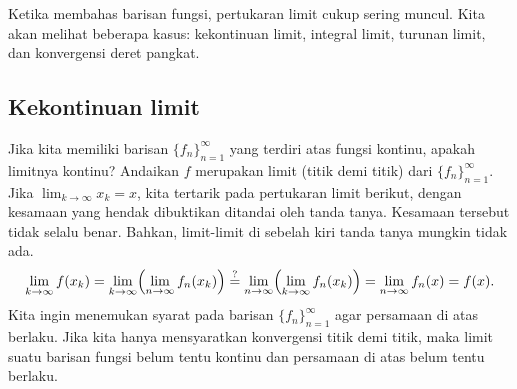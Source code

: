 Ketika membahas barisan fungsi, pertukaran limit cukup sering muncul.
Kita akan melihat beberapa kasus: kekontinuan limit,
integral limit, turunan limit, dan konvergensi
deret pangkat.

\subsection{Kekontinuan limit}

Jika kita memiliki barisan $\{ f_n \}_{n=1}^\infty$ yang terdiri atas fungsi kontinu, apakah limitnya kontinu?
Andaikan $f$ merupakan limit (titik demi titik) dari $\{ f_n \}_{n=1}^\infty$.
Jika $\lim_{k\to\infty} x_k = x$,
kita tertarik pada
pertukaran limit berikut, dengan kesamaan yang hendak dibuktikan
ditandai oleh tanda tanya.  Kesamaan tersebut tidak selalu benar.
Bahkan, limit-limit di sebelah kiri
tanda tanya mungkin tidak ada.
\begin{equation*}
\lim_{k \to \infty} 
f(x_k)
=
\lim_{k \to \infty} 
\Bigl(
\lim_{n \to \infty} f_n(x_k)
\Bigr)
\overset{?}{=}
\lim_{n \to \infty}
\Bigl(
\lim_{k \to \infty} 
f_n(x_k)
\Bigr)
=
\lim_{n \to \infty}
f_n(x)
=
f(x) .
\end{equation*}
Kita ingin menemukan syarat pada barisan $\{ f_n \}_{n=1}^\infty$
agar persamaan di atas berlaku.
Jika kita hanya mensyaratkan konvergensi titik demi titik, maka limit
suatu barisan fungsi belum tentu kontinu dan persamaan di atas
belum tentu berlaku.

